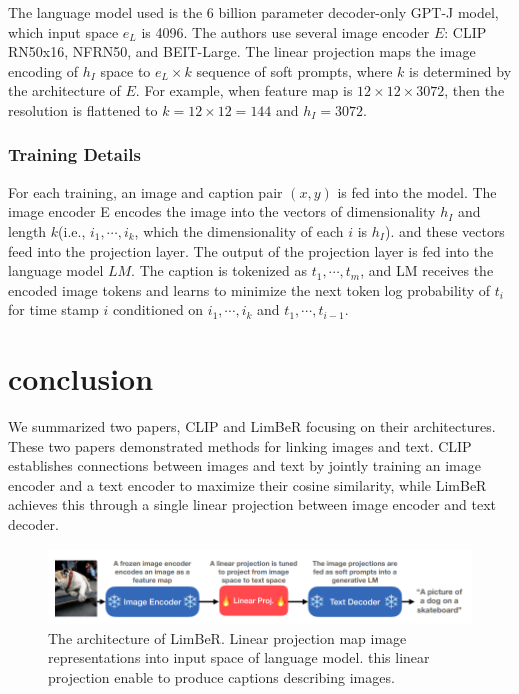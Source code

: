 \documentclass[extendedabs]{bmvc2k}
\begin{document}
The language model used is the 6 billion parameter decoder-only GPT-J model, which input space $e_L$ is 4096. The authors use several image encoder $E$: CLIP RN50x16\cite{clip}, NFRN50\cite{nfrn}, and BEIT-Large\cite{beit}. The linear projection maps the image encoding of $h_I$ space to $e_L \times k$ sequence of soft prompts, where $k$ is determined by the architecture of $E$. For example, when feature map is $12\times12\times3072$, then the resolution is flattened to $k=12\times12 = 144$ and $h_I = 3072$.

\subsubsection{Training Details}
For each training, an image and caption pair $(x,y)$ is fed into the model. The image encoder E encodes the image into the vectors of dimensionality $h_I$ and length $k$(i.e., $i_1, \cdots, i_k$, which the dimensionality of each $i$ is $h_I$). and these vectors feed into the projection layer. The output of the projection layer is fed into the language model $LM$. The caption is tokenized as $t_1, \cdots ,t_m$, and LM receives the encoded image tokens and learns to minimize the next token log probability of $t_i$ for time stamp $i$ conditioned on $i_1, \cdots,i_k$ and $t_1,\cdots,t_{i-1}$.

\section{conclusion}
We summarized two papers, CLIP\cite{clip} and LimBeR\cite{linearmapping} focusing on their architectures. These two papers demonstrated methods for linking images and text. CLIP establishes connections between images and text by jointly training an image encoder and a text encoder to maximize their cosine similarity, while LimBeR achieves this through a single linear projection between image encoder and text decoder.



\begin{figure}[t]
\centering
	\includegraphics[width=\linewidth]{images/fig3.PNG}
	\caption{
		The architecture of LimBeR. Linear projection map image representations into input space of language model. this linear projection enable to produce captions describing images.}
	\vspace{-2mm}
        \label{fig:limberarch}
\end{figure}

\newpage

\end{document}
